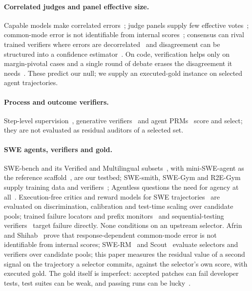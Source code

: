 \documentclass[11pt]{article}
\begin{document}
\paragraph{Correlated judges and panel effective size.} Capable models make correlated errors~\citep{goel2025great,kim2025correlated}; judge panels supply few effective votes~\citep{kohli2026nine,hossain2026agreement}; common-mode error is not identifiable from internal scores~\citep{afrin2026ensembles}; consensus can rival trained verifiers where errors are decorrelated~\citep{verga2024juries,liu2026jury} and disagreement can be structured into a confidence estimator~\citep{jiang2026discouq}. On code, verification helps only on margin-pivotal cases and a single round of debate erases the disagreement it needs~\citep{shu2026pivotal,shu2026unanimity}. These predict our null; we supply an executed-gold instance on selected agent trajectories.

\paragraph{Process and outcome verifiers.} Step-level supervision~\citep{lightman2023verify,wang2024mathshepherd}, generative verifiers~\citep{zhang2024genrm} and agent PRMs~\citep{xi2025agentprm} score and select; they are not evaluated as residual auditors of a selected set.

\paragraph{SWE agents, verifiers and gold.} SWE-bench and its Verified and Multilingual subsets~\citep{jimenez2024swebench,swebenchverified2024,yang2025multilingual}, with mini-SWE-agent as the reference scaffold~\citep{miniswe2025}, are our testbed; SWE-smith, SWE-Gym and R2E-Gym supply training data and verifiers~\citep{yang2025swesmith,pan2024swegym,jain2025r2egym}; Agentless questions the need for agency at all~\citep{xia2024agentless}. Execution-free critics and reward models for SWE trajectories~\citep{yadavally2025critics,shum2025swerm} are evaluated on discrimination, calibration and test-time scaling over candidate pools; trained failure locators and prefix monitors~\citep{rahman2026scout,wang2026failfast} and sequential-testing verifiers~\citep{sadhuka2025evaluator} target failure directly. None conditions on an upstream selector. Afrin and Shihab~\citep{afrin2026ensembles} prove that response-dependent common-mode error is not identifiable from internal scores; SWE-RM~\citep{shum2025swerm} and Scout~\citep{rahman2026scout} evaluate selectors and verifiers over candidate pools; this paper measures the residual value of a second signal on the trajectory a selector commits, against the selector's own score, with executed gold. The gold itself is imperfect: accepted patches can fail developer tests, test suites can be weak, and passing runs can be lucky~\citep{wang2025solved,rajan2026auditing,agentlens2026,wang2026horizon}.
\end{document}

